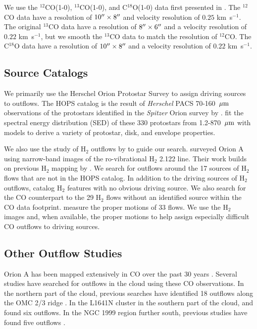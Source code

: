 \documentclass[twocolumn]{aastex63}
\newcommand{\kms}{km~s$^{-1}$}
\newcommand{\co}[1][]{\ensuremath{^{#1}}CO}
\begin{document}
We use the \co[12](1-0), \co[13](1-0), and C$^{18}$O(1-0) data first presented in \citet{Kong18}. The \co[12]{} data have a resolution of $10\mbox{$^{\prime\prime}$}\times8\mbox{$^{\prime\prime}$}$ and velocity resolution of $0.25$ \kms{}. The original \co[13] data have a resolution of $8\mbox{$^{\prime\prime}$}\times6\mbox{$^{\prime\prime}$}$ and a velocity resolution of $0.22$ \kms{}, but we smooth the \co[13]{} data to match the resolution of \co[12]{}. The C$^{18}$O data have a resolution of $10\mbox{$^{\prime\prime}$}\times8\mbox{$^{\prime\prime}$}$ and a velocity resolution of $0.22$ \kms{}.

\subsection{Source Catalogs}
We primarily use the Herschel Orion Protostar Survey \citep[HOPS;][]{Furlan16} to assign driving sources to outflows. The HOPS catalog is the result of \emph{Herschel} PACS 70-160~$\mbox{$\mu$m}{}$ observations of the protostars identified in the \emph{Spitzer} Orion survey by \citet{Megeath12}. \citet{Furlan16} fit the spectral energy distribution (SED) of these 330 protostars from 1.2-870~$\mbox{$\mu$m}{}$ with models to derive a variety of protostar, disk, and envelope properties.

We also use the study of H$_2$ outflows by \citet{Davis09} to guide our search. \citet{Davis09} surveyed Orion A using narrow-band images of the ro-vibrational H$_2$ 2.122 \micron{} line. Their work builds on previous H$_2$ mapping by \citet{Stanke02}. We search for outflows around the 17 sources of H$_2$ flows that are not in the HOPS catalog. In addition to the driving sources of H$_2$ outflows, \citet{Davis09} catalog H$_2$ features with no obvious driving source. We also search for the CO counterpart to the 29 H$_2$ flows without an identified source within the CO data footprint. \citet{Davis09} measure the proper motions of 33 flows. We use the H$_2$ images and, when available, the proper motions to help assign especially difficult CO outflows to driving sources.

\subsection{Other Outflow Studies}
Orion A has been mapped extensively in CO over the past 30 years \citep[e.g.][]{Bally87,Wilson05,Shimajiri11,Buckle12,Ripple13,Berne14}. Several studies have searched for outflows in the cloud using these CO observations. In the northern part of the cloud, previous searches have identified 18 outflows along the OMC 2/3 ridge \citep{Chini97,Aso00,Williams03,Takahashi08,Shimajiri08,Shimajiri09}. In the L1641N cluster in the southern part of the cloud, \citet{Stanke07} and \citet{Nakamura12} found six outflows. In the NGC 1999 region further south, previous studies have found five outflows \citep{Morgan91,Moro-Martin99,Davis2000,Choi17}. 
\end{document}
